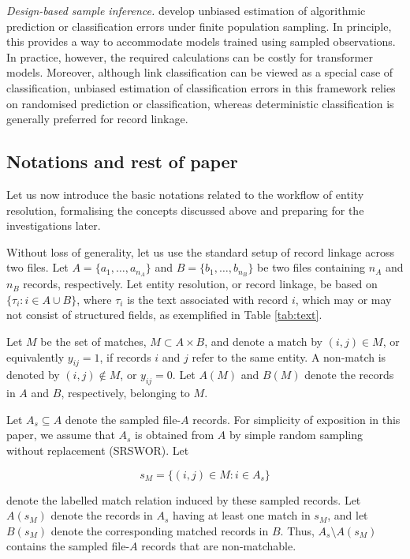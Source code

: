 \emph{Design-based sample inference.}
\citet{zhang2025predictive, zhang2026debiasing} develop unbiased estimation of algorithmic prediction or classification errors under finite population sampling. In principle, this provides a way to accommodate models trained using sampled observations. In practice, however, the required calculations can be costly for transformer models. Moreover, although link classification can be viewed as a special case of classification, unbiased estimation of classification errors in this framework relies on randomised prediction or classification, whereas deterministic classification is generally preferred for record linkage.




\subsection{Notations and rest of paper}
\label{sec:setting}

Let us now introduce the basic notations related to the workflow of entity resolution, formalising the concepts discussed above and preparing for the investigations later.

Without loss of generality, let us use the standard setup of record linkage across two files. Let
$A = \{a_1, \ldots, a_{n_A}\}$ and
$B = \{b_1, \ldots, b_{n_B}\}$
be two files containing $n_A$ and $n_B$ records, respectively. Let entity resolution, or record linkage, be based on
$\{\tau_i : i \in A \cup B\}$,
where $\tau_i$ is the text associated with record $i$, which may or may not consist of structured fields, as exemplified in Table \ref{tab:text}.

Let $M$ be the set of matches, $M \subset A \times B$, and denote a match by $(i,j) \in M$, or equivalently $y_{ij}=1$, if records $i$ and $j$ refer to the same entity. A non-match is denoted by $(i,j) \notin M$, or $y_{ij}=0$. Let $A(M)$ and $B(M)$ denote the records in $A$ and $B$, respectively, belonging to $M$.

Let $A_s\subseteq A$ denote the sampled file-$A$ records. For simplicity of
exposition in this paper, we assume that $A_s$ is obtained from $A$ by simple random
sampling without replacement (SRSWOR). Let

\[
s_M=\{(i,j)\in M:i\in A_s\}
\]

denote the labelled match relation induced by these sampled records. Let $A(s_M)$
denote the records in $A_s$ having at least one match in $s_M$, and let $B(s_M)$
denote the corresponding matched records in $B$. Thus,
$A_s\setminus A(s_M)$ contains the sampled file-$A$ records that are non-matchable.

